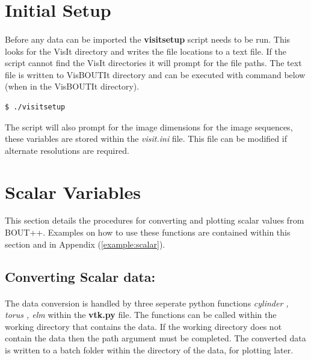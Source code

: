 \documentclass[12pt,a4paper]{article}
\begin{document}
	
\section{Initial Setup}
\label{sec:initial}
\paragraph{}
	
Before any data can be imported the \textbf{visitsetup} script needs to be run. This looks for the VisIt directory and writes the file locations to a text file. If the script cannot find the VisIt directories it will prompt for the file paths. The text file is written to VisBOUTIt directory and can be executed with command below (when in the VisBOUTIt directory).
	
\begin{verbatim}
$ ./visitsetup
\end{verbatim}
	
The script will also prompt for the image dimensions for the image sequences, these variables are stored within the \textit{visit.ini} file. This file can be modified if alternate resolutions are required.

	
	
\section{Scalar Variables}
\label{sec:scalar} This section details the procedures for converting and plotting scalar values from BOUT++. Examples on how to use these functions are contained within this section and in Appendix (\ref{example:scalar}).
	
	\subsection{Converting Scalar data:}
	
	\paragraph{}
	The data conversion is handled by three seperate python functions \textit{cylinder , torus , elm} within the \textbf{vtk.py} file. The functions can be called within the working directory that contains the data. If the working directory does not contain the data then the path argument must be completed. The converted data is written to a batch folder within the directory of the data, for plotting later.
\end{document}
